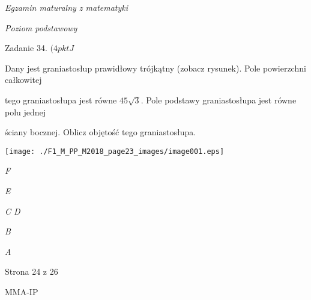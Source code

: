 \documentclass[a4paper,12pt]{article}
\begin{document}
{\it Egzamin maturalny z matematyki}

{\it Poziom podstawowy}

Zadanie 34. $(4pktJ$

Dany jest graniastosłup prawidłowy trójkątny (zobacz rysunek). Pole powierzchni całkowitej

tego graniastosłupa jest równe $45\sqrt{3}$. Pole podstawy graniastosłupa jest równe polu jednej

ściany bocznej. Oblicz objętość tego graniastosłupa.
\begin{center}
\texttt{[image: ./F1\_M\_PP\_M2018\_page23\_images/image001.eps]}
\end{center}
{\it F}

{\it E}

{\it C  D}

{\it B}

{\it A}

Strona 24 z 26

MMA-IP
\end{document}

